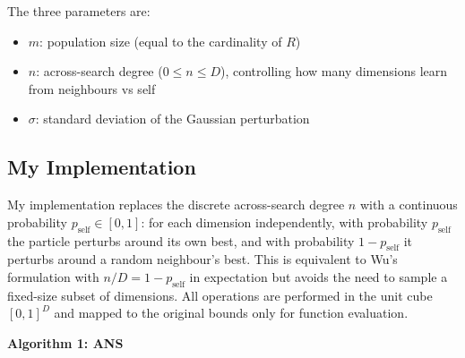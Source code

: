 \documentclass[11pt,a4paper]{article}
\begin{document}
The three parameters are:
\begin{itemize}
    \item $m$: population size (equal to the cardinality of $R$)
    \item $n$: across-search degree ($0 \leq n \leq D$), controlling how many dimensions learn from neighbours vs self
    \item $\sigma$: standard deviation of the Gaussian perturbation
\end{itemize}

\subsection{My Implementation}

My implementation replaces the discrete across-search degree $n$ with a continuous probability $p_{\text{self}} \in [0, 1]$: for each dimension independently, with probability $p_{\text{self}}$ the particle perturbs around its own best, and with probability $1 - p_{\text{self}}$ it perturbs around a random neighbour's best. This is equivalent to Wu's formulation with $n/D = 1 - p_{\text{self}}$ in expectation but avoids the need to sample a fixed-size subset of dimensions. All operations are performed in the unit cube $[0, 1]^D$ and mapped to the original bounds only for function evaluation.

\bigskip
\noindent\textbf{Algorithm 1: ANS}
\label{alg:ans}

\smallskip
\noindent{}
\end{document}
